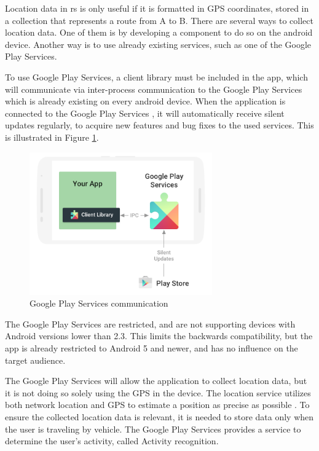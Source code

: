 Location data in \gls{rs} is only useful if it is formatted in GPS coordinates, stored in a collection that represents a route from A to B.
There are several ways to collect location data. 
One of them is by developing a component to do so on the android device. 
Another way is to use already existing services, such as one of the Google Play Services.


To use Google Play Services, a client library must be included in the app, which will communicate via inter-process communication to the Google Play Services which is already existing on every android device. 
When the application is connected to the Google Play Services \cite{GapiOverview}, it will automatically receive silent updates regularly, to acquire new features and bug fixes to the used services. 
This is illustrated in Figure \ref{fig:gapifigure}.

\begin{figure}[h]
	\centering
	\includegraphics[width=0.7\textwidth]{figures/play-services-diagram.png}
	\caption{Google Play Services communication\cite{GapiFigure}}
	\label{fig:gapifigure}
\end{figure}

The Google Play Services are restricted, and are not supporting devices with Android versions lower than 2.3. 
This limits the backwards compatibility, but the app is already restricted to Android 5 and newer, and has no influence on the target audience.

The Google Play Services will allow the application to collect location data, but it is not doing so solely using the GPS in the device. 
The location service utilizes both network location and GPS to estimate a position as precise as possible \cite{GapiLocation}. 
To ensure the collected location data is relevant, it is needed to store data only when the user is traveling by vehicle.
The Google Play Services provides a service to determine the user's activity, called Activity recognition. 

